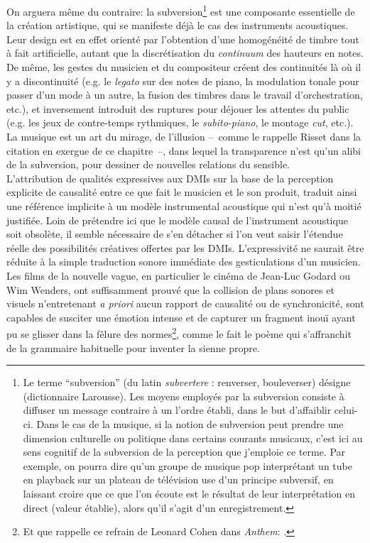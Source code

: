 \indent On arguera même du contraire: la subversion\footnote{Le terme ``subversion'' (du latin \textit{subvertere} : renverser, bouleverser) désigne  (dictionnaire Larousse). Les moyens employés par la subversion consiste à diffuser un message contraire à un l'ordre établi, dans le but d'affaiblir celui-ci. Dans le cas de la musique, si la notion de subversion peut prendre une dimension culturelle ou politique dans certains courants musicaux, c'est ici au sens cognitif de la subversion de la perception que j'emploie ce terme. Par exemple, on pourra dire qu'un groupe de musique pop interprétant un tube en playback sur un plateau de télévision use d'un principe subversif, en laissant croire que ce que l'on écoute est le résultat de leur interprétation en direct (valeur établie), alors qu'il s'agit d'un enregistrement. } est une composante essentielle de la création artistique, qui se manifeste déjà le cas des instruments acoustiques. Leur design est en effet orienté par l'obtention d'une homogénéité de timbre tout à fait artificielle, autant que la discrétisation du \textit{continuum} des hauteurs en notes. De même, les gestes du musicien et du compositeur créent des continuités là où il y a discontinuité (e.g. le \textit{legato} sur des notes de piano, la modulation tonale pour passer d'un mode à un autre, la fusion des timbres dans le travail d'orchestration, etc.),  et inversement introduit des ruptures pour déjouer les attentes du public (e.g. les jeux de contre-temps rythmiques, le \textit{subito-piano}, le montage \textit{cut}, etc.). La musique est un art du mirage, de l'illusion --~comme le rappelle Risset dans la citation en exergue de ce chapitre~--, dans lequel la transparence n'est qu'un alibi de la subversion, pour dessiner de nouvelles relations du sensible.\\
\indent L'attribution de qualités expressives aux \glspl{DMI} sur la base de la perception explicite de causalité entre ce que fait le musicien et le son produit, traduit ainsi une référence implicite à un modèle instrumental acoustique qui n'est qu'à moitié justifiée. Loin de prétendre ici que le modèle causal de l'instrument acoustique soit obsolète, il semble nécessaire de s'en détacher si l'on veut saisir l'étendue réelle des possibilités créatives offertes par les \glspl{DMI}. L'expressivité ne saurait être réduite à la simple traduction sonore immédiate des gesticulations d'un musicien. Les films de la nouvelle vague, en particulier le cinéma de Jean-Luc Godard ou Wim Wenders, ont suffisamment prouvé que la collision de plans sonores et visuels n'entretenant \textit{a priori} aucun rapport de causalité ou de synchronicité, sont capables de susciter une émotion intense et de capturer un fragment inouï ayant pu se glisser dans la fêlure des normes\footnote{Et que rappelle ce refrain de Leonard Cohen dans \textit{Anthem}: .}, comme le fait le poème qui s'affranchit de la grammaire habituelle pour inventer la sienne propre.\\
